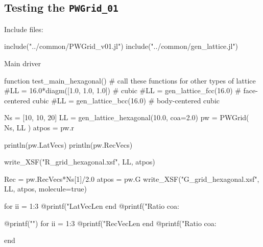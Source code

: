 \subsection{Testing the {\tt PWGrid\_01}}

Include files:

\begin{juliacode}
include("../common/PWGrid_v01.jl")
include("../common/gen_lattice.jl")
\end{juliacode}

Main driver

\begin{juliacode}
function test_main_hexagonal()
  # call these functions for other types of lattice
  #LL = 16.0*diagm([1.0, 1.0, 1.0]) # cubic
  #LL = gen_lattice_fcc(16.0)       # face-centered cubic
  #LL = gen_lattice_bcc(16.0)       # body-centered cubic

  Ns = [10, 10, 20]
  LL = gen_lattice_hexagonal(10.0, coa=2.0)
  pw = PWGrid( Ns, LL )
  atpos = pw.r

  println(pw.LatVecs)
  println(pw.RecVecs)

  write_XSF("R_grid_hexagonal.xsf", LL, atpos)

  Rec = pw.RecVecs*Ns[1]/2.0
  atpos = pw.G
  write_XSF("G_grid_hexagonal.xsf", LL, atpos, molecule=true)

  for ii = 1:3
    @printf("LatVecLen %
  end
  @printf("Ratio coa: %

  @printf("\n")
  for ii = 1:3
    @printf("RecVecLen %
  end
  @printf("Ratio coa: %

end
\end{juliacode}

